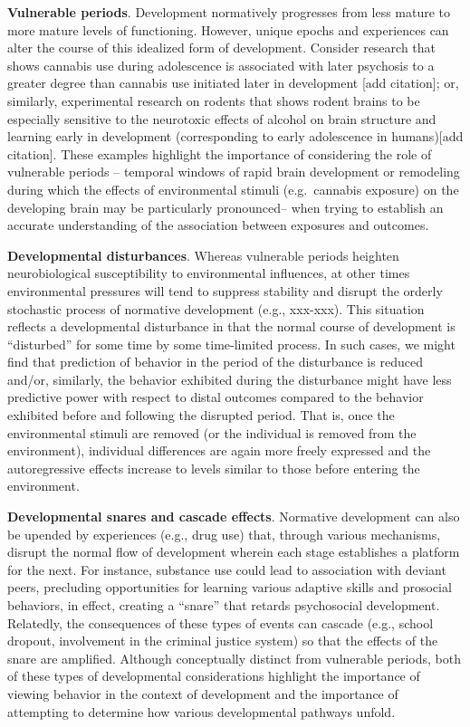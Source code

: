 \documentclass[
  10pt,
  letterpaper,
]{article}
\begin{document}
\textbf{Vulnerable periods}. Development normatively progresses from
less mature to more mature levels of functioning. However, unique epochs
and experiences can alter the course of this idealized form of
development. Consider research that shows cannabis use during
adolescence is associated with later psychosis to a greater degree than
cannabis use initiated later in development {[}add citation{]}; or,
similarly, experimental research on rodents that shows rodent brains to
be especially sensitive to the neurotoxic effects of alcohol on brain
structure and learning early in development (corresponding to early
adolescence in humans){[}add citation{]}. These examples highlight the
importance of considering the role of vulnerable periods -- temporal
windows of rapid brain development or remodeling during which the
effects of environmental stimuli (e.g.~cannabis exposure) on the
developing brain may be particularly pronounced-- when trying to
establish an accurate understanding of the association between exposures
and outcomes.

\textbf{Developmental disturbances}. Whereas vulnerable periods heighten
neurobiological susceptibility to environmental influences, at other
times environmental pressures will tend to suppress stability and
disrupt the orderly stochastic process of normative development (e.g.,
xxx-xxx). This situation reflects a developmental disturbance in that
the normal course of development is ``disturbed'' for some time by some
time-limited process. In such cases, we might find that prediction of
behavior in the period of the disturbance is reduced and/or, similarly,
the behavior exhibited during the disturbance might have less predictive
power with respect to distal outcomes compared to the behavior exhibited
before and following the disrupted period. That is, once the
environmental stimuli are removed (or the individual is removed from the
environment), individual differences are again more freely expressed and
the autoregressive effects increase to levels similar to those before
entering the environment.

\textbf{Developmental snares and cascade effects}. Normative development
can also be upended by experiences (e.g., drug use) that, through
various mechanisms, disrupt the normal flow of development wherein each
stage establishes a platform for the next. For instance, substance use
could lead to association with deviant peers, precluding opportunities
for learning various adaptive skills and prosocial behaviors, in effect,
creating a ``snare'' that retards psychosocial development. Relatedly,
the consequences of these types of events can cascade (e.g., school
dropout, involvement in the criminal justice system) so that the effects
of the snare are amplified. Although conceptually distinct from
vulnerable periods, both of these types of developmental considerations
highlight the importance of viewing behavior in the context of
development and the importance of attempting to determine how various
developmental pathways unfold.
\end{document}
